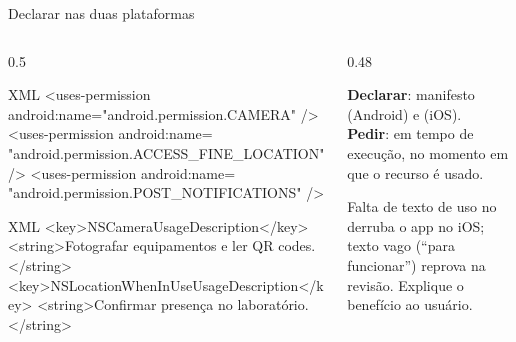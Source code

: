 \documentclass[aspectratio=169,10pt]{beamer}
\begin{document}
\begin{frame}[fragile]{Declarar nas duas plataformas}
  \begin{columns}[T]
    \begin{column}{0.5\textwidth}
\begin{codigo}[title=android/app/src/main/AndroidManifest.xml]{XML}
<uses-permission
    android:name="android.permission.CAMERA" />
<uses-permission android:name=
    "android.permission.ACCESS_FINE_LOCATION" />
<uses-permission android:name=
    "android.permission.POST_NOTIFICATIONS" />
\end{codigo}
\begin{codigo}[title=ios/Runner/Info.plist]{XML}
<key>NSCameraUsageDescription</key>
<string>Fotografar equipamentos e ler QR codes.</string>
<key>NSLocationWhenInUseUsageDescription</key>
<string>Confirmar presença no laboratório.</string>
\end{codigo}
    \end{column}
    \begin{column}{0.48\textwidth}
      \begin{conceito}
        \textbf{Declarar}: manifesto (Android) e  (iOS).\\
        \textbf{Pedir}: em tempo de execução, no momento em que o recurso é usado.
      \end{conceito}
      \begin{erro}
        Falta de texto de uso no  derruba o app no iOS; texto vago (``para funcionar'') reprova na revisão. Explique o benefício ao usuário.
      \end{erro}
    \end{column}
  \end{columns}
\end{frame}
\end{document}
